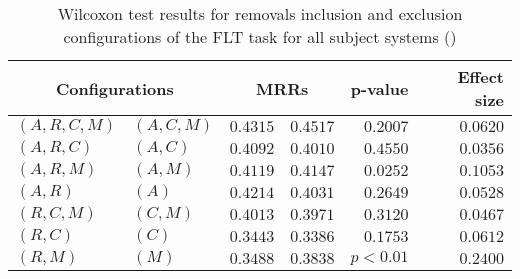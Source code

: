 
\begin{table}
\begin{spacing}{1.2}
\centering
\caption{Wilcoxon test results for removals inclusion and exclusion configurations of the FLT task for all subject systems (\ctwo)}
\label{table:versus-wilcox-all-flt-removals}
\begin{tabular}{ll|rr|rr}
\toprule
      \multicolumn{2}{c|}{Configurations} &                \multicolumn{2}{c|}{MRRs} &             p-value & Effect size \\
\midrule
 $(A,R,C,M)$ &  $(A,C,M)$ &       $0.4315$ &  $\bm{0.4517}$ & $0.2007$ &    $0.0620$ \\
   $(A,R,C)$ &    $(A,C)$ &  $\bm{0.4092}$ &       $0.4010$ & $0.4550$ &    $0.0356$ \\
   $(A,R,M)$ &    $(A,M)$ &       $0.4119$ &  $\bm{0.4147}$ & $0.0252$ &    $0.1053$ \\
     $(A,R)$ &      $(A)$ &  $\bm{0.4214}$ &       $0.4031$ & $0.2649$ &    $0.0528$ \\
   $(R,C,M)$ &    $(C,M)$ &  $\bm{0.4013}$ &       $0.3971$ & $0.3120$ &    $0.0467$ \\
     $(R,C)$ &      $(C)$ &  $\bm{0.3443}$ &       $0.3386$ & $0.1753$ &    $0.0612$ \\
     $(R,M)$ &      $(M)$ &       $0.3488$ &  $\bm{0.3838}$ & $p<0.01$ &    $0.2400$ \\
\bottomrule
\end{tabular}

\end{spacing}
\end{table}

